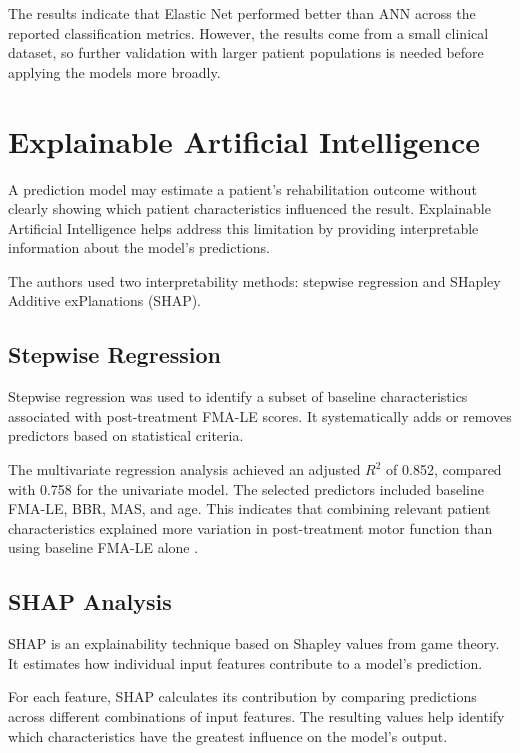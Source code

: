The results indicate that Elastic Net performed better than ANN across the reported classification metrics. However, the results come from a small clinical dataset, so further validation with larger patient populations is needed before applying the models more broadly.

\section{{Explainable Artificial Intelligence}}

A prediction model may estimate a patient's rehabilitation outcome without clearly showing which patient characteristics influenced the result. Explainable Artificial Intelligence helps address this limitation by providing interpretable information about the model's predictions.

The authors used two interpretability methods: stepwise regression and SHapley Additive exPlanations (SHAP).

\subsection{{Stepwise Regression}}

Stepwise regression was used to identify a subset of baseline characteristics associated with post-treatment FMA-LE scores. It systematically adds or removes predictors based on statistical criteria.

The multivariate regression analysis achieved an adjusted $R^2$ of 0.852, compared with 0.758 for the univariate model. The selected predictors included baseline FMA-LE, BBR, MAS, and age. This indicates that combining relevant patient characteristics explained more variation in post-treatment motor function than using baseline FMA-LE alone \cite{bib1}.

\subsection{{SHAP Analysis}}

SHAP is an explainability technique based on Shapley values from game theory. It estimates how individual input features contribute to a model's prediction.

For each feature, SHAP calculates its contribution by comparing predictions across different combinations of input features. The resulting values help identify which characteristics have the greatest influence on the model's output.

